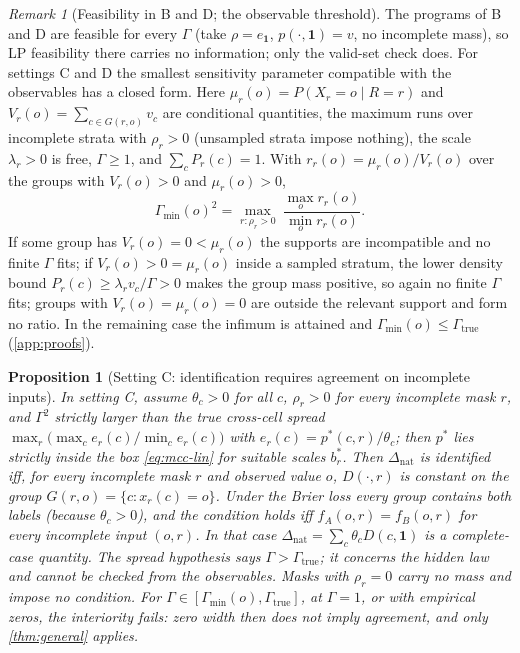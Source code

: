 \documentclass{article}
\theoremstyle{plain}
\newtheorem{proposition}[theorem]{Proposition}
\theoremstyle{definition}
\theoremstyle{remark}
\newtheorem{remark}[theorem]{Remark}
\newcommand{\one}{\mathbf{1}}
\newcommand{\Dnat}{\Delta_{\mathrm{nat}}}
\begin{document}
\begin{remark}[Feasibility in B and D; the observable threshold]\label{rem:gmin}
The programs of B and D are feasible for every $\Gamma$ (take $\rho=e_{\one}$,
$p(\cdot,\one)=v$, no incomplete mass), so LP feasibility there carries no
information; only the valid-set check does. For settings C and D the
smallest sensitivity parameter compatible with the observables has a closed
form. Here $\mu_r(o)=P(X_r=o\mid R=r)$ and $V_r(o)=\sum_{c\in G(r,o)}v_c$ are
conditional quantities, the maximum runs over incomplete strata with
$\rho_r>0$ (unsampled strata impose nothing), the scale $\lambda_r>0$ is free,
$\Gamma\ge1$, and $\sum_cP_r(c)=1$. With $r_r(o)=\mu_r(o)/V_r(o)$ over the groups
with $V_r(o)>0$ and $\mu_r(o)>0$,
\[
\Gamma_{\min}(o)^2=\max_{r:\rho_r>0}\ \frac{\max_o r_r(o)}{\min_o r_r(o)}.
\]
If some group has $V_r(o)=0<\mu_r(o)$ the supports are incompatible and no
finite $\Gamma$ fits; if $V_r(o)>0=\mu_r(o)$ inside a sampled stratum, the lower
density bound $P_r(c)\ge\lambda_rv_c/\Gamma>0$ makes the group mass positive, so
again no finite $\Gamma$ fits; groups with $V_r(o)=\mu_r(o)=0$ are outside the
relevant support and form no ratio. In the remaining case the infimum is
attained and $\Gamma_{\min}(o)\le\Gamma_{\mathrm{true}}$ (\cref{app:proofs}).
\end{remark}

\begin{proposition}[Setting C: identification requires agreement on incomplete inputs]\label{prop:C}
In setting C, assume $\theta_c>0$ for all $c$, $\rho_r>0$ for every
incomplete mask $r$, and $\Gamma^2$ strictly larger than the true cross-cell
spread $\max_r\big(\max_c e_r(c)/\min_c e_r(c)\big)$ with
$e_r(c)=p^*(c,r)/\theta_c$; then $p^*$ lies strictly inside the box
\eqref{eq:mcc-lin} for suitable scales $b^*_r$. Then $\Dnat$ is identified iff,
for every incomplete mask $r$ and observed value $o$, $D(\cdot,r)$ is
constant on the group $G(r,o)=\{c:x_r(c)=o\}$. Under the Brier loss every
group contains both labels (because $\theta_c>0$), and the condition holds
iff $f_A(o,r)=f_B(o,r)$ for every incomplete input $(o,r)$. In that case
$\Dnat=\sum_c\theta_c D(c,\one)$ is a complete-case quantity. The spread
hypothesis says $\Gamma>\Gamma_{\mathrm{true}}$; it concerns the hidden law and
cannot be checked from the observables. Masks with $\rho_r=0$ carry no mass
and impose no condition. For $\Gamma\in[\Gamma_{\min}(o),\Gamma_{\mathrm{true}}]$,
at $\Gamma=1$, or with empirical zeros, the interiority fails: zero width then
does not imply agreement, and only \cref{thm:general} applies.
\end{proposition}
\end{document}
